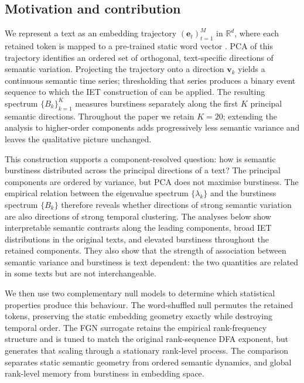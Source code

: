 \documentclass[12pt,a4paper]{article}
\newcommand{\R}{\mathbb{R}}
\begin{document}
 
\subsection{Motivation and contribution}
 
We represent a text as an embedding trajectory
$(\mathbf{e}_t)_{t=1}^M$ in $\R^d$, where each retained token is mapped
to a pre-trained static word vector
\citep{Mikolov2013,Pennington2014}.
PCA of this trajectory identifies an ordered set of orthogonal,
text-specific directions of semantic variation.
Projecting the trajectory onto a direction $\mathbf{v}_k$ yields a
continuous semantic time series; thresholding that series produces a
binary event sequence to which the IET construction of
\citet{Altmann2012} can be applied.
The resulting spectrum $\{B_k\}_{k=1}^K$ measures burstiness separately
along the first $K$ principal semantic directions.
Throughout the paper we retain $K=20$; extending the analysis to
higher-order components adds progressively less semantic variance and
leaves the qualitative picture unchanged.
 
This construction supports a component-resolved question:
how is semantic burstiness distributed across the principal directions
of a text?
The principal components are ordered by variance, but PCA does not
maximise burstiness.
The empirical relation between the eigenvalue spectrum
$\{\lambda_k\}$ and the burstiness spectrum $\{B_k\}$ therefore reveals
whether directions of strong semantic variation are also directions of
strong temporal clustering.
The analyses below show interpretable semantic contrasts along the
leading components, broad IET distributions in the original texts, and
elevated burstiness throughout the retained components.
They also show that the strength of association between semantic
variance and burstiness is text dependent: the two quantities are
related in some texts but are not interchangeable.
 
We then use two complementary null models to determine which statistical
properties produce this behaviour.
The word-shuffled null permutes the retained tokens, preserving the
static embedding geometry exactly while destroying temporal order.
The FGN surrogate retains the empirical rank-frequency structure and is
tuned to match the original rank-sequence DFA exponent, but generates
that scaling through a stationary rank-level process.
The comparison separates static semantic geometry from ordered semantic
dynamics, and global rank-level memory from burstiness in embedding
space.
 
\end{document}
